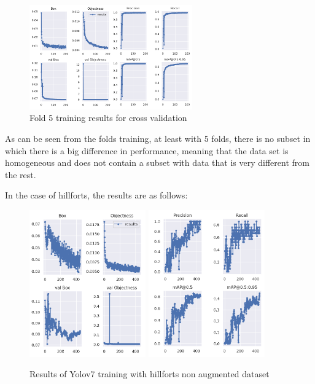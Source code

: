 \begin{figure}[H]
\centering
\includegraphics[width=7cm]{images/training/cross/04.png}
\caption{Fold 5 training results for cross validation}
\end{figure}

As can be seen from the folds training, at least with 5 folds, there is no subset in which there is a big difference in performance, meaning that the data set is homogeneous and does not contain a subset with data that is very different from the rest.


In the case of hillforts, the results are as follows:

\begin{figure}[H]
    \centering
    {{\includegraphics[width=5cm]{images/training/castros/notaug1.png} }}
    \qquad
    {{\includegraphics[width=5cm]{images/training/castros/notaug2.png} }}
    \caption{Results of Yolov7 training with hillforts non augmented dataset}
    \label{fig:example}
\end{figure}

